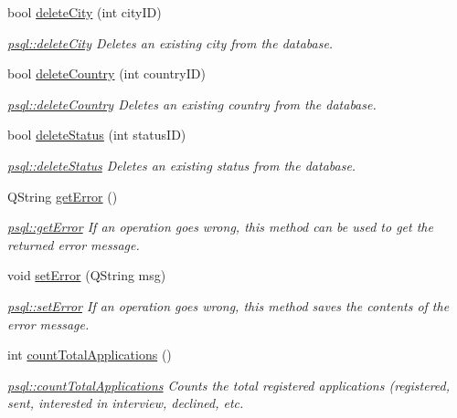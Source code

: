 \begin{DoxyCompactItemize}
bool \mbox{\hyperlink{classpsql_aaffd42b26b635d9881daaf5fbf4fd62f}{delete\+City}} (int city\+ID)
\begin{DoxyCompactList}\small\item\em \mbox{\hyperlink{classpsql_aaffd42b26b635d9881daaf5fbf4fd62f}{psql\+::delete\+City}} Deletes an existing city from the database. \end{DoxyCompactList}\item 
bool \mbox{\hyperlink{classpsql_a914bf8701fbed4ff80edcd0d09c7c3fd}{delete\+Country}} (int country\+ID)
\begin{DoxyCompactList}\small\item\em \mbox{\hyperlink{classpsql_a914bf8701fbed4ff80edcd0d09c7c3fd}{psql\+::delete\+Country}} Deletes an existing country from the database. \end{DoxyCompactList}\item 
bool \mbox{\hyperlink{classpsql_a26fc592cfb9f484e1bee62af527f2b95}{delete\+Status}} (int status\+ID)
\begin{DoxyCompactList}\small\item\em \mbox{\hyperlink{classpsql_a26fc592cfb9f484e1bee62af527f2b95}{psql\+::delete\+Status}} Deletes an existing status from the database. \end{DoxyCompactList}\item 
Q\+String \mbox{\hyperlink{classpsql_a5f51e254b67ff932f287df2184ccc043}{get\+Error}} ()
\begin{DoxyCompactList}\small\item\em \mbox{\hyperlink{classpsql_a5f51e254b67ff932f287df2184ccc043}{psql\+::get\+Error}} If an operation goes wrong, this method can be used to get the returned error message. \end{DoxyCompactList}\item 
void \mbox{\hyperlink{classpsql_a9a0d5ba32aabe6018a36fb0bc185445b}{set\+Error}} (Q\+String msg)
\begin{DoxyCompactList}\small\item\em \mbox{\hyperlink{classpsql_a9a0d5ba32aabe6018a36fb0bc185445b}{psql\+::set\+Error}} If an operation goes wrong, this method saves the contents of the error message. \end{DoxyCompactList}\item 
int \mbox{\hyperlink{classpsql_afc6d7fe8bd179fb7341917b430883963}{count\+Total\+Applications}} ()
\begin{DoxyCompactList}\small\item\em \mbox{\hyperlink{classpsql_afc6d7fe8bd179fb7341917b430883963}{psql\+::count\+Total\+Applications}} Counts the total registered applications (registered, sent, interested in interview, declined, etc. \end{DoxyCompactList}\item 

\end{DoxyCompactItemize}
